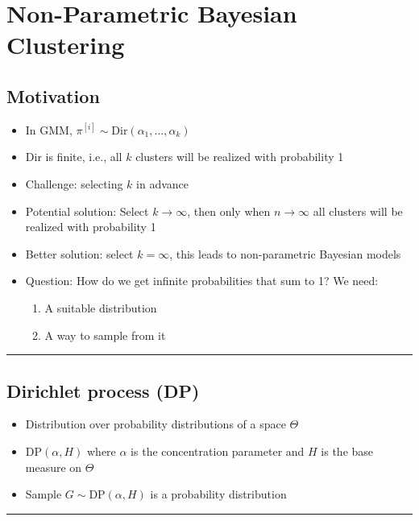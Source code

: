\section{Non-Parametric Bayesian Clustering}
\subsection*{Motivation}
\begin{itemize}
    \item In GMM, $\pi^{[i]} \sim \textrm{Dir}(\alpha_1, ..., \alpha_k)$
    \item $\textrm{Dir}$ is finite, i.e., all $k$ clusters will be realized with probability 1
    \item Challenge: selecting $k$ in advance
    \item Potential solution: Select $k \to \infty$, then only when $n \to \infty$ all clusters will be realized with probability 1
    \item Better solution: select $k = \infty$, this leads to non-parametric Bayesian models
    \item Question: How do we get infinite probabilities that sum to 1? We need:
    \begin{enumerate}
        \item A suitable distribution
        \item A way to sample from it
    \end{enumerate}
\end{itemize}

{\color{black}\hrule height 0.001mm}

\subsection*{Dirichlet process (DP)}
\begin{itemize}
    \item Distribution over probability distributions of a space $\Theta$
    \item $\textrm{DP}(\alpha, H)$ where $\alpha$ is the concentration parameter and $H$ is the base measure on $\Theta$
    \item Sample $G \sim \textrm{DP}(\alpha, H)$ is a probability distribution
\end{itemize}

{\color{black}\hrule height 0.001mm}

